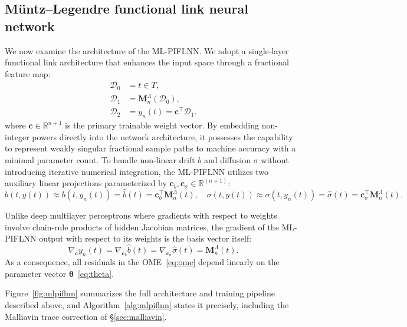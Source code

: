 \documentclass[11pt, a4paper]{article}
\theoremstyle{theoremstyle}
\theoremstyle{definitionstyle}
\begin{document}
 \subsection{M\"untz--Legendre functional link neural network}
We now examine the architecture of the ML-PIFLNN. We adopt a single-layer functional link architecture that enhances the input space through a fractional feature map:
\begin{subequations}
    \begin{align}
        \mathcal D_0 &= t \in T, \\
        \mathcal D_1 &= \mathbf M_n^\Lambda(\mathcal D_0), \\
        \mathcal D_2 &= y_n(t) = \mathbf c^\top \mathcal D_1.
    \end{align}
\end{subequations}
where $\mathbf c \in \mathbb R^{n+1}$ is the primary trainable weight vector. By embedding non-integer powers directly into the network architecture, it possesses the capability to represent weakly singular fractional sample paths to machine accuracy with a minimal parameter count. To handle non-linear drift $b$ and diffusion $\sigma$ without introducing iterative numerical integration, the ML-PIFLNN utilizes two auxiliary linear projections parameterized by $\mathbf c_b, \mathbf c_\sigma \in \mathbb R^{(n+1)}$:
\begin{equation}
    b(t, y(t)) \approx b(t, y_n(t)) = \hat b(t) = \mathbf c_b^\top \mathbf M_n^\Lambda(t), \quad \sigma(t, y(t)) \approx \sigma(t, y_n(t)) = \hat \sigma(t) = \mathbf c_\sigma^\top \mathbf M_n^\Lambda(t).
\end{equation}

Unlike deep multilayer perceptrons where gradients with respect to weights involve chain-rule products of hidden Jacobian matrices, the gradient of the ML-PIFLNN output with respect to its weights is the basis vector itself:
\begin{equation}
    \nabla_{\mathbf c} y_n(t) = \nabla_{\mathbf c_b} \hat b(t) = \nabla_{\mathbf c_\sigma} \hat \sigma(t) = \mathbf M_n^\Lambda(t).
\end{equation}
As a consequence, all residuals in the OME~\eqref{eq:ome} depend linearly on the parameter vector $\boldsymbol \theta$~\eqref{eq:theta}.

Figure~\ref{fig:mlpiflnn} summarizes the full architecture and training pipeline described above, and Algorithm~\ref{alg:mlpiflnn} states it precisely, including the Malliavin trace correction of \S\ref{sec:malliavin}.
\end{document}
